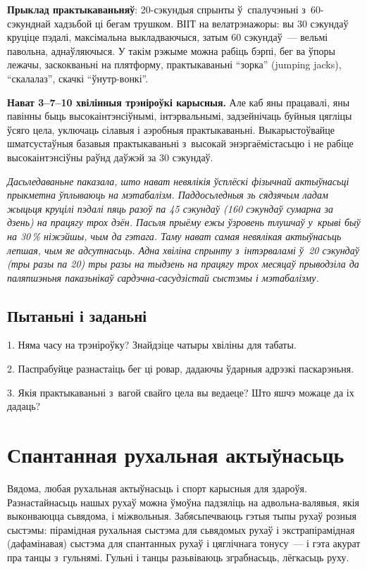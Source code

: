 \textbf{Прыклад практыкаваньняў}: 20-сэкундыя спрынты ў~спалучэньні з~60-сэкунднай хадзьбой ці бегам трушком. ВІІТ на велатрэнажоры: вы 30 сэкундаў круціце пэдалі, максімальна выкладваючыся, затым 60 сэкундаў~--- вельмі павольна, аднаўляючыся. У такім рэжыме можна рабіць бэрпі, бег ва ўпоры лежачы, заскокваньні на плятформу, практыкаваньні ``зорка'' (jumping jacks), ``скалалаз'', скачкі ``ўнутр-вонкі''.

\textbf{Нават 3--7--10 хвілінныя трэніроўкі карысныя.} Але каб яны працавалі, яны павінны быць высокаінтэнсіўнымі, інтэрвальнымі, задзейнічаць буйныя цягліцы ўсяго цела, уключаць сілавыя і аэробныя практыкаваньні. Выкарыстоўвайце шматсустаўныя базавыя практыкаваньні з~высокай энэргаёмістасьцю і не рабіце высокаінтэнсіўны раўнд даўжэй за 30 сэкундаў. 

\emph{Дасьледаваньне паказала, што нават невялікія ўсплёскі фізычнай актыўнасьці прыкметна ўплываюць на мэтабалізм. Паддосьледныя зь сядзячым ладам жыцьця круцілі пэдалі пяць разоў па 45 сэкундаў (160 сэкундаў сумарна за дзень) на працягу трох дзён. Пасьля прыёму ежы ўзровень тлушчаў у~крыві быў на 30\,\% ніжэйшы, чым да гэтага. Таму нават самая невялікая актыўнасьць лепшая, чым яе адсутнасьць. Адна хвіліна спрынту з~інтэрваламі ў~20 сэкундаў (тры разы па 20) тры разы на тыдзень на працягу трох месяцаў прыводзіла да паляпшэньня паказьнікаў сардэчна-сасудзістай сыстэмы і мэтабалізму.}

\subsection*{Пытаньні і заданьні}

1. Няма часу на трэніроўку? Знайдзіце чатыры хвіліны для табаты.

2. Паспрабуйце разнастаіць бег ці ровар, дадаючы ўдарныя адрэзкі паскарэньня.

3. Якія практыкаваньні з~вагой свайго цела вы ведаеце? Што яшчэ можаце да іх дадаць?


\section{Спантанная рухальная актыўнасьць}

Вядома, любая рухальная актыўнасьць і спорт карысныя для здароўя. Разнастайнасьць нашых рухаў можна ўмоўна падзяліць на адвольна-валявыя, якія выконваюцца сьвядома, і міжвольныя. Забясьпечваюць гэтыя тыпы рухаў розныя сыстэмы: пірамідная рухальная сыстэма для сьвядомых рухаў і экстрапірамідная (дафамінавая) сыстэма для спантанных рухаў і цяглічнага тонусу~--- і гэта акурат пра танцы з~гульнямі. Гульні і танцы разьвіваюць зграбнасьць, лёгкасьць руху. 


